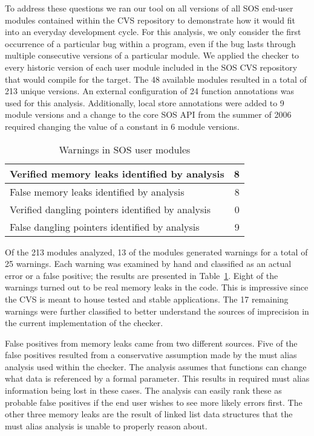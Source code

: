 To address these questions we ran our tool on all versions of all SOS
end-user modules contained within the CVS repository to demonstrate
how it would fit into an everyday development cycle.  For this
analysis, we only consider the first occurrence of a particular bug
within a program, even if the bug lasts through multiple consecutive
versions of a particular module.  We applied the checker to every
historic version of each user module included in the SOS CVS
repository that would compile for the  target.  The 48
available modules resulted in a total of 213 unique versions.
%
An external configuration of 24 function annotations was used for this
analysis.  
%
Additionally, local store annotations were added to 9 module versions
and a change to the core SOS API from the summer of 2006 required
changing the value of a constant in 6 module versions.


\begin{table}
\caption{Warnings in SOS user modules}
%
\label{tab:module}
\centering 
\begin{tabular}{| l | r |}
    \hline 
    Verified memory leaks identified by analysis & 8 \\
    \hline
    False memory leaks identified by analysis & 8 \\
    \hline 
    Verified dangling pointers identified by analysis & 0 \\
    \hline 
    False dangling pointers identified by analysis & 9 \\
    \hline 
\end{tabular} 
%
\end{table}

Of the 213 modules analyzed, 13 of the modules generated warnings for a
total of 25 warnings.
%
Each warning was examined by hand and classified as an actual error or
a false positive; the results are presented in Table~\ref{tab:module}.  
%
Eight of the warnings turned out to be real memory leaks in the code.
This is impressive since the CVS is meant to house tested and stable
applications.
%
The 17 remaining warnings were further classified to better understand
the sources of imprecision in the current implementation of the
checker.  

\smallskip{}

False positives from memory leaks came from two different sources.
Five of the false positives resulted from a conservative assumption
made by the must alias analysis used within the checker.  The analysis
assumes that functions can change what data is referenced by a formal
parameter.  This results in required must alias information being lost
in these cases.  The analysis can easily rank these as probable false
positives if the end user wishes to see more likely errors first.  The
other three memory leaks are the result of linked list data structures
that the must alias analysis is unable to properly reason about.  


